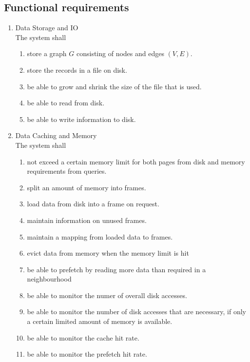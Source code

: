 	\subsection{Functional requirements}
\begin{enumerate}[label*=\arabic*]
\item Data Storage and IO \\
    The system shall
	\begin{enumerate}[label*=\arabic*]
	\item store a graph $G$ consisting of nodes and edges $(V, E)$.
	\item store the records in a file on disk.
    \item be able to grow and shrink the size of the file that is used.
    \item be able to read from disk.
    \item be able to write information to disk.
	\end{enumerate}
	
\item Data Caching and Memory  \\
    The system shall
	\begin{enumerate}[label*=\arabic*]
	\item not exceed a certain memory limit for both pages from disk and memory requirements from queries.
	\item split an amount of memory into frames.
	\item load data from disk into a frame on request.
	\item maintain information on unused frames.
	\item maintain a mapping from loaded data to frames.
	\item evict data from memory when the memory limit is hit
	\item be able to prefetch by reading more data than required in a neighbourhood
    \item be able to monitor the numer of overall disk accesses.
	\item be able to monitor the number of disk accesses that are necessary, if only a certain limited amount of memory is available.
	\item be able to monitor the cache hit rate.
	\item be able to monitor the prefetch hit rate.
	\end{enumerate}


\end{enumerate}
